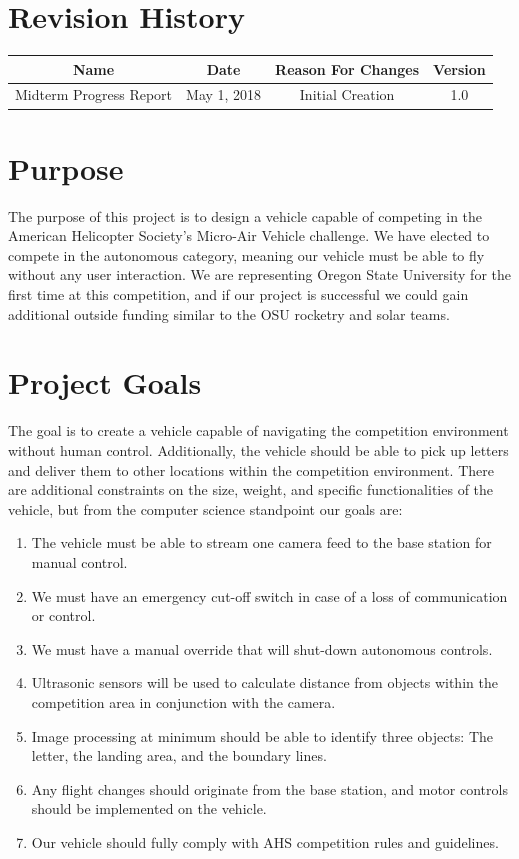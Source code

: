 \documentclass[onecolumn, draftclsnofoot,10pt, compsoc]{IEEEtran}
\begin{document}
\section*{Revision History}

\begin{center}
    \begin{tabular}{|c|c|c|c|}
        \hline
		Name & Date & Reason For Changes & Version\\
        \hline
		Midterm Progress Report & May 1, 2018 & Initial Creation & 1.0\\
		\hline
    \end{tabular}
\end{center}




\section{Purpose}

The purpose of this project is to design a vehicle capable of competing in the American Helicopter Society’s Micro-Air Vehicle challenge. We have elected to compete in the autonomous category, meaning our vehicle must be able to fly without any user interaction. We are representing Oregon State University for the first time at this competition, and if our project is successful we could gain additional outside funding similar to the OSU rocketry and solar teams.

\section{Project Goals}
The goal is to create a vehicle capable of navigating the competition environment without human control. Additionally, the vehicle should be able to pick up letters and deliver them to other locations within the competition environment. There are additional constraints on the size, weight, and specific functionalities of the vehicle, but from the computer science standpoint our goals are:

\begin{enumerate}
\item{The vehicle must be able to stream one camera feed to the base station for manual control. }
\item{We must have an emergency cut-off switch in case of a loss of communication or control. }
\item{We must have a manual override that will shut-down autonomous controls.}
\item{Ultrasonic sensors will be used to calculate distance from objects within the competition area in conjunction with the camera.}
\item{Image processing at minimum should be able to identify three objects: The letter, the landing area, and the boundary lines.}
\item{Any flight changes should originate from the base station, and motor controls should be implemented on the vehicle.}
\item{Our vehicle should fully comply with AHS competition rules and guidelines. }
\end{enumerate}
\end{document}

